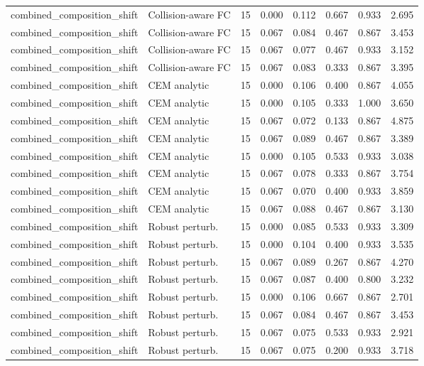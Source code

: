 {\begin{longtable}{llrrrrrr}
combined\_composition\_shift & Collision-aware FC & 15 & 0.000 & 0.112 & 0.667 & 0.933 & 2.695 \\
combined\_composition\_shift & Collision-aware FC & 15 & 0.067 & 0.084 & 0.467 & 0.867 & 3.453 \\
combined\_composition\_shift & Collision-aware FC & 15 & 0.067 & 0.077 & 0.467 & 0.933 & 3.152 \\
combined\_composition\_shift & Collision-aware FC & 15 & 0.067 & 0.083 & 0.333 & 0.867 & 3.395 \\
combined\_composition\_shift & CEM analytic & 15 & 0.000 & 0.106 & 0.400 & 0.867 & 4.055 \\
combined\_composition\_shift & CEM analytic & 15 & 0.000 & 0.105 & 0.333 & 1.000 & 3.650 \\
combined\_composition\_shift & CEM analytic & 15 & 0.067 & 0.072 & 0.133 & 0.867 & 4.875 \\
combined\_composition\_shift & CEM analytic & 15 & 0.067 & 0.089 & 0.467 & 0.867 & 3.389 \\
combined\_composition\_shift & CEM analytic & 15 & 0.000 & 0.105 & 0.533 & 0.933 & 3.038 \\
combined\_composition\_shift & CEM analytic & 15 & 0.067 & 0.078 & 0.333 & 0.867 & 3.754 \\
combined\_composition\_shift & CEM analytic & 15 & 0.067 & 0.070 & 0.400 & 0.933 & 3.859 \\
combined\_composition\_shift & CEM analytic & 15 & 0.067 & 0.088 & 0.467 & 0.867 & 3.130 \\
combined\_composition\_shift & Robust perturb. & 15 & 0.000 & 0.085 & 0.533 & 0.933 & 3.309 \\
combined\_composition\_shift & Robust perturb. & 15 & 0.000 & 0.104 & 0.400 & 0.933 & 3.535 \\
combined\_composition\_shift & Robust perturb. & 15 & 0.067 & 0.089 & 0.267 & 0.867 & 4.270 \\
combined\_composition\_shift & Robust perturb. & 15 & 0.067 & 0.087 & 0.400 & 0.800 & 3.232 \\
combined\_composition\_shift & Robust perturb. & 15 & 0.000 & 0.106 & 0.667 & 0.867 & 2.701 \\
combined\_composition\_shift & Robust perturb. & 15 & 0.067 & 0.084 & 0.467 & 0.867 & 3.453 \\
combined\_composition\_shift & Robust perturb. & 15 & 0.067 & 0.075 & 0.533 & 0.933 & 2.921 \\
combined\_composition\_shift & Robust perturb. & 15 & 0.067 & 0.075 & 0.200 & 0.933 & 3.718 \\

\end{longtable}}
